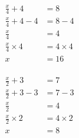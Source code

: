 \documentclass[12pt]{article}
\newcounter{minipagecount}
\begin{document}
\begin{multicols}{2}
\begin{minipage}[t]{0.45\textwidth}
\begin{align*}
        \frac{x}{4} + 4 &= 8\\
        \frac{x}{4} + 4 - 4 &= 8 - 4\\
        \frac{x}{4} &= 4\\
        \frac{x}{4} \times4 &= 4 \times4\\
        x &= 16\\
    \end{align*}
\end{minipage} %
\noindent{(\theminipagecount)}\hspace{0.1mm} %
\begin{minipage}[t]{0.45\textwidth} %
    \vspace{-26pt}  %
    \raggedright %
    \begin{align*} %
        \frac{x}{2} + 3 &= 7\\
        \frac{x}{2} + 3 - 3 &= 7 - 3\\
        \frac{x}{2} &= 4\\
        \frac{x}{2} \times2 &= 4 \times2\\
        x &= 8\\
    \end{align*}
\end{minipage}\columnbreak
\noindent{(\theminipagecount)}\hspace{0.1mm} %
\begin{minipage}[t]{0.45\textwidth} %
    \vspace{-26pt}  %
    \raggedright %

\end{minipage}
\end{multicols}
\end{document}

